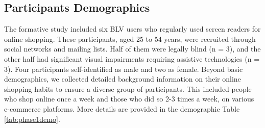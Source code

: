

\subsection{Participants Demographics}
The formative study included six BLV users who regularly used screen readers for online shopping. These participants, aged 25 to 54 years, were recruited through social networks and mailing lists. Half of them were legally blind (n = 3), and the other half had significant visual impairments requiring assistive technologies (n = 3). Four participants self-identified as male and two as female. Beyond basic demographics, we collected detailed background information on their online shopping habits to ensure a diverse group of participants. This included people who shop online once a week and those who did so 2-3 times a week, on various e-commerce platforms. More details are provided in the demographic Table \ref{tab:phase1demo}.

